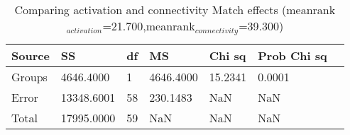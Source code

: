 \begin{table}
\centering
\begin{tabular}[0.2em]{@{}lllllll@{}}\toprule
Source & SS & df & MS & Chi sq & Prob Chi sq\\\toprule[0.2em]
Groups & 4646.4000 & 1 & 4646.4000 & 15.2341 & 0.0001 \\\midrule
Error & 13348.6001 & 58 & 230.1483 & NaN & NaN \\\midrule
Total & 17995.0000 & 59 & NaN & NaN & NaN \\\bottomrule[0.2em]
\end{tabular}
\caption{Comparing activation and connectivity Match effects (meanrank$_{activation}$=21.700,meanrank$_{connectivity}$=39.300)\label{tabel:matchMetric}}
\end{table}
